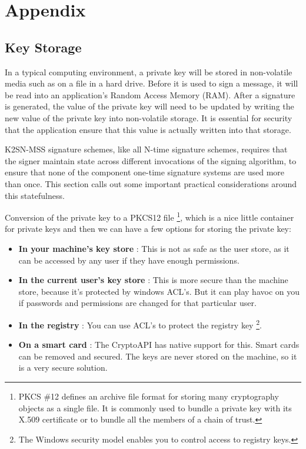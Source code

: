 
\chapter{Appendix}
\section{Key Storage}
In a typical computing environment, a private key will be stored in non-volatile media such as on a file in a hard drive. Before it is used to sign a message, it will be read into an application's Random Access Memory (RAM). After a signature is generated, the value of the private key will need to be updated by writing the new value of the private key into non-volatile storage. It is essential for security that the application ensure that this value is actually written into that storage.

K2SN-MSS signature schemes, like all N-time signature schemes, requires that the signer maintain state across different invocations of the signing algorithm, to ensure that none of the component one-time signature systems are used more than once. This section calls out some important practical considerations around this statefulness.


Conversion of the private key to a PKCS12 file \footnote{PKCS \#12 defines an archive file format for storing many cryptography objects as a single file. It is commonly used to bundle a private key with its X.509 certificate or to bundle all the members of a chain of trust.}, which is a nice little container for private keys and then we can have a few options for storing the private key:
\begin{itemize}
    \item \textbf{In your machine's key store} : This is not as safe as the user store, as it can be accessed by any user if they have enough permissions.
    \item \textbf{In the current user's key store} : This is more secure than the machine store, because it's protected by windows ACL's. But it can play havoc on you if passwords and permissions are changed for that particular user.
    \item \textbf{In the registry} : You can use ACL's to protect the registry key \footnote{The Windows security model enables you to control access to registry keys.}.
    \item \textbf{On a smart card} : The CryptoAPI has native support for this. Smart cards can be removed and secured. The keys are never stored on the machine, so it is a very secure solution.
    
\end{itemize}

